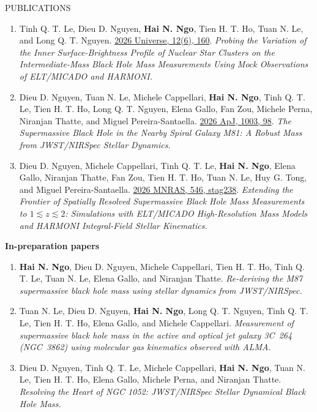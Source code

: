 \documentclass{resume} %
\begin{document}
\begin{rSection}{PUBLICATIONS}
\begin{enumerate}
\item Tinh Q. T. Le, {Dieu D. Nguyen}, \textbf{Hai N. Ngo}, Tien H. T. Ho, Tuan N. Le, and Long Q. T. Nguyen. \textcolor{blue}{\href{https://doi.org/10.3390/universe12060160}{2026 Universe, 12(6), 160}}. \textit{Probing the Variation of the Inner Surface-Brightness Profile of Nuclear Star Clusters on the Intermediate-Mass Black Hole Mass Measurements Using Mock Observations of ELT/MICADO and HARMONI.}

\item {Dieu D. Nguyen}, Tuan N. Le, Michele Cappellari, \textbf{Hai N. Ngo}, Tinh Q. T. Le, Tien H. T. Ho, Long Q. T. Nguyen, Elena Gallo, Fan Zou, Michele Perna, Niranjan Thatte, and Miguel Pereira-Santaella. \textcolor{blue}{\href{https://doi.org/10.3847/1538-4357/ae64f0}{2026 ApJ, 1003, 98}}. \textit{The Supermassive Black Hole in the Nearby Spiral Galaxy M81: A Robust Mass from JWST/NIRSpec Stellar Dynamics.}

\item {Dieu D. Nguyen}, Michele Cappellari, Tinh Q. T. Le, \textbf{Hai N. Ngo}, Elena Gallo, Niranjan Thatte, Fan Zou, Tien H. T. Ho, Tuan N. Le, Huy G. Tong, and Miguel Pereira-Santaella. \textcolor{blue}{\href{https://doi.org/10.1093/mnras/stag238}{2026 MNRAS, 546, stag238}}. \textit{Extending the Frontier of Spatially Resolved Supermassive Black Hole Mass Measurements to $1 \lesssim z \lesssim 2$: Simulations with ELT/MICADO High-Resolution Mass Models and HARMONI Integral-Field Stellar Kinematics.}
\end{enumerate}
\textbf{In-preparation papers}
\begin{enumerate}
\item \textbf{Hai N. Ngo}, {Dieu D. Nguyen}, Michele Cappellari, Tien H. T. Ho,  Tinh Q. T. Le, Tuan N. Le, Elena Gallo, and Niranjan Thatte. \textit{Re-deriving the M87 supermassive black hole mass using stellar dynamics from JWST/NIRSpec.} %

\item Tuan N. Le, {Dieu D. Nguyen}, \textbf{Hai N. Ngo}, Long Q. T. Nguyen, Tinh Q. T. Le, Tien H. T. Ho, Elena Gallo, and Michele Cappellari. \textit{Measurement of supermassive black hole mass in the active and optical jet galaxy 3C~264 (NGC~3862) using molecular gas kinematics observed with ALMA.}  %

\item {Dieu D. Nguyen}, Tinh Q. T. Le, Michele Cappellari, \textbf{Hai N. Ngo}, Tuan N. Le, Tien H. T. Ho, Elena Gallo, Michele Perna, and Niranjan Thatte. \textit{Resolving the Heart of NGC 1052: JWST/NIRSpec Stellar Dynamical Black Hole Mass.} %


\end{enumerate}
\end{rSection}
\end{document}
